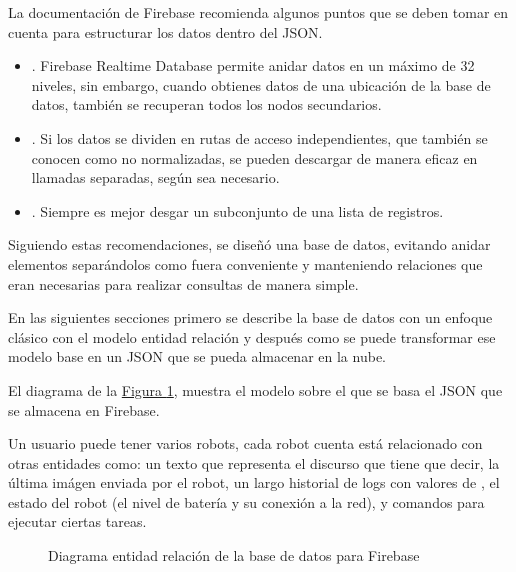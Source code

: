 La documentación de Firebase recomienda algunos puntos que se deben tomar
en cuenta para estructurar los datos dentro del JSON.
\begin{itemize}
\item {} 
. Firebase Realtime Database permite anidar datos en un máximo de 32 niveles, sin embargo, cuando obtienes datos de una ubicación de la base de datos, también se recuperan todos los nodos secundarios.

\item {} 
. Si los datos se dividen en rutas de acceso independientes, que también se conocen como no normalizadas, se pueden descargar de manera eficaz en llamadas separadas, según sea necesario.

\item {} 
. Siempre es mejor desgar un subconjunto de una lista de registros.

\end{itemize}

Siguiendo estas recomendaciones, se diseñó una base de datos, evitando anidar
elementos separándolos como fuera conveniente y manteniendo relaciones que
eran necesarias para realizar consultas de manera simple.

En las siguientes secciones primero se describe la base de datos con un enfoque
clásico con el modelo entidad relación y después como se puede transformar ese
modelo base en un JSON que se pueda almacenar en la nube.

El diagrama de la \hyperref[\detokenize{chapter_two/desc_cloudnao:entity-relationship-model-cn-firebase}]{Figura \ref{\detokenize{chapter_two/desc_cloudnao:entity-relationship-model-cn-firebase}}}, muestra el
modelo sobre el que se basa el JSON que se almacena en Firebase.

Un usuario puede tener varios robots, cada robot cuenta está relacionado
con otras entidades como: un texto que representa el discurso que tiene que decir,
la última imágen enviada por el robot, un largo historial de
logs con valores de , el estado del robot (el nivel de batería y
su conexión a la red), y comandos para ejecutar ciertas tareas.

\begin{figure}[htbp]
\centering
\capstart

\noindent{}
\caption{Diagrama entidad relación de la base de datos para Firebase}\label{\detokenize{chapter_two/desc_cloudnao:entity-relationship-model-cn-firebase}}\end{figure}


